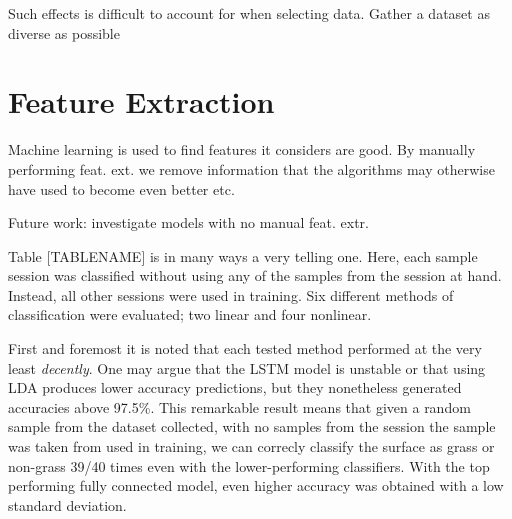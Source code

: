 Such effects is difficult to account for when selecting data. Gather a dataset as diverse as possible

\section{Feature Extraction}
 Machine learning is used to find features it considers are good. By manually performing feat. ext. we remove information that the algorithms may otherwise have used to become even better etc. 

Future work: investigate models with no manual feat. extr.

Table [TABLENAME] is in many ways a very telling one. Here, each sample session was classified without using any of the samples from the session at hand. Instead, all other sessions were used in training. Six different methods of classification were evaluated; two linear and four nonlinear. 

First and foremost it is noted that each tested method performed at the very least \emph{decently}. One may argue that the LSTM model is unstable or that using LDA produces lower accuracy predictions, but they nonetheless generated accuracies above 97.5\%. This remarkable result means that given a random sample from the dataset collected, with no samples from the session the sample was taken from used in training, we can correcly classify the surface as grass or non-grass 39/40 times even with the lower-performing classifiers. With the top performing fully connected model, even higher accuracy was obtained with a low standard deviation. 

